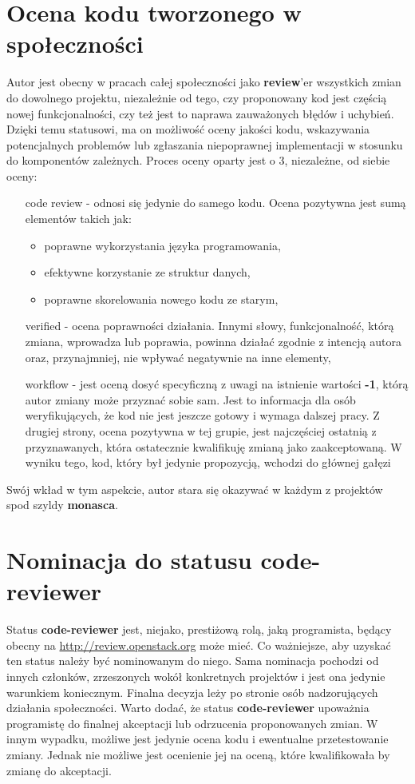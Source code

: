 \section{Ocena kodu tworzonego w społeczności}
Autor jest obecny w pracach całej społeczności jako \textbf{review}'er wszystkich zmian do dowolnego projektu, niezależnie od tego, czy 
proponowany kod jest częścią nowej funkcjonalności, czy też jest to naprawa zauważonych błędów i uchybień. Dzięki temu statusowi, ma on
możliwość oceny jakości kodu, wskazywania potencjalnych problemów lub zgłaszania niepoprawnej implementacji w stosunku do komponentów zależnych.
Proces oceny oparty jest o 3, niezależne, od siebie oceny:
\begin{itemize}
    \item[code review] - odnosi się jedynie do samego kodu. Ocena pozytywna jest sumą elementów takich jak:
    \begin{itemize}
        \item poprawne wykorzystania języka programowania,
        \item efektywne korzystanie ze struktur danych,
        \item poprawne skorelowania nowego kodu ze starym,
    \end{itemize}
    \item[verified] -  ocena poprawności działania. Innymi słowy, funkcjonalność, którą zmiana, wprowadza lub poprawia, powinna działać
    zgodnie z intencją autora oraz, przynajmniej, nie wpływać negatywnie na inne elementy,
    \item[workflow] - jest oceną dosyć specyficzną z uwagi na istnienie wartości \textbf{-1}, którą autor zmiany może przyznać sobie sam.
    Jest to informacja dla osób weryfikujących, że kod nie jest jeszcze gotowy i wymaga dalszej pracy. Z drugiej strony, ocena pozytywna w tej grupie,
    jest najczęściej ostatnią z przyznawanych, która ostatecznie kwalifikuję zmianą jako zaakceptowaną. W wyniku tego, kod, który był
    jedynie propozycją, wchodzi do głównej gałęzi
\end{itemize}
Swój wkład w tym aspekcie, autor stara się okazywać w każdym z projektów spod szyldy \textbf{monasca}.

\section{Nominacja do statusu code-reviewer}
Status \textbf{code-reviewer} jest, niejako, prestiżową rolą, jaką programista, będący obecny na \url{http://review.openstack.org} może mieć.
Co ważniejsze, aby uzyskać ten status należy być nominowanym do niego. Sama nominacja pochodzi od innych członków, zrzeszonych wokół
konkretnych projektów i jest ona jedynie warunkiem koniecznym. Finalna decyzja leży po stronie osób nadzorujących działania społeczności.
Warto dodać, że status \textbf{code-reviewer} upoważnia programistę do finalnej akceptacji lub odrzucenia proponowanych zmian. W innym wypadku,
możliwe jest jedynie ocena kodu i ewentualne przetestowanie zmiany. Jednak nie możliwe jest ocenienie jej na oceną, które kwalifikowała
by zmianę do akceptacji.